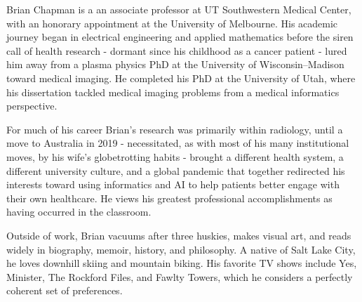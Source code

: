 Brian Chapman is a an associate professor at UT Southwestern Medical Center, with an honorary appointment at the University of Melbourne. His academic journey began in electrical engineering and applied mathematics before the siren call of health research - dormant since his childhood as a cancer patient - lured him away from a plasma physics PhD at the University of Wisconsin–Madison toward medical imaging. He completed his PhD at the University of Utah, where his dissertation tackled medical imaging problems from a medical informatics perspective.

For much of his career Brian's research was primarily within radiology, until a move to Australia in 2019 - necessitated, as with most of his many institutional moves, by his wife's globetrotting habits - brought a different health system, a different university culture, and a global pandemic that together redirected his interests toward using informatics and AI to help patients better engage with their own healthcare. He views his greatest professional accomplishments as having occurred in the classroom.

Outside of work, Brian vacuums after three huskies, makes visual art, and reads widely in biography, memoir, history, and philosophy. A native of Salt Lake City, he loves downhill skiing and mountain biking. His favorite TV shows include Yes, Minister, The Rockford Files, and Fawlty Towers, which he considers a perfectly coherent set of preferences.
